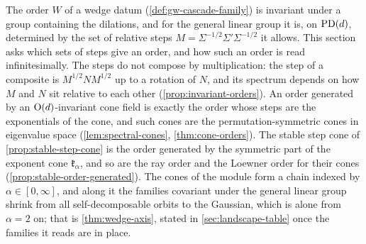 The order $W$ of a wedge datum (\ref{def:gw-cascade-family}) is invariant under a group containing the
dilations, and for the general linear group it is, on $\mathrm{PD}(d)$, determined by the set of relative steps
$M = \Sigma^{-1/2}\Sigma'\Sigma^{-1/2}$ it allows. This section asks which sets of steps give an order,
and how such an order is read infinitesimally. The steps do not compose by multiplication: the step of a
composite is $M^{1/2}NM^{1/2}$ up to a rotation of $N$, and its spectrum depends on how $M$ and $N$ sit
relative to each other (\ref{prop:invariant-orders}). An order generated by an $\mathrm{O}(d)$-invariant
cone field is exactly the order whose steps are the exponentials of the cone, and such cones are the
permutation-symmetric cones in eigenvalue space (\ref{lem:spectral-cones}, \ref{thm:cone-orders}). The
stable step cone of \ref{prop:stable-step-cone} is the order generated by the symmetric part of the
exponent cone $\mathfrak k_\alpha$, and so are the ray order and the Loewner order for their cones
(\ref{prop:stable-order-generated}). The cones of the module form a chain indexed by
$\alpha \in [0, \infty]$, and along it the families covariant under the general linear group shrink
from all self-decomposable orbits to the Gaussian, which is alone from $\alpha = 2$ on; that is
\ref{thm:wedge-axis}, stated in \ref{sec:landscape-table} once the families it reads are in place.

